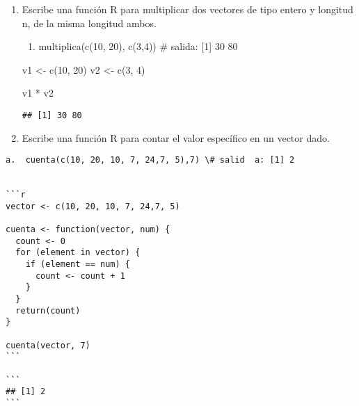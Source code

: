 \documentclass[
]{article}
\newenvironment{Shaded}{\begin{snugshade}}{\end{snugshade}}
\newcommand{\DecValTok}[1]{\textcolor[rgb]{0.00,0.00,0.81}{#1}}
\newcommand{\FunctionTok}[1]{\textcolor[rgb]{0.00,0.00,0.00}{#1}}
\newcommand{\NormalTok}[1]{#1}
\newcommand{\OtherTok}[1]{\textcolor[rgb]{0.56,0.35,0.01}{#1}}
\newcommand{\SpecialCharTok}[1]{\textcolor[rgb]{0.00,0.00,0.00}{#1}}
\providecommand{\tightlist}{%
  \setlength{\itemsep}{0pt}\setlength{\parskip}{0pt}}
\begin{document}
\begin{enumerate}
\def\labelenumi{\arabic{enumi}.}
\setcounter{enumi}{6}
\item
  Escribe una función R para multiplicar dos vectores de tipo entero y
  longitud n, de la misma longitud ambos.

  \begin{enumerate}
  \def\labelenumii{\alph{enumii}.}
  \tightlist
  \item
    multiplica(c(10, 20), c(3,4)) \# salida: {[}1{]} 30 80
  \end{enumerate}

\begin{Shaded}
\begin{Highlighting}[]
\NormalTok{v1 }\OtherTok{\textless{}{-}} \FunctionTok{c}\NormalTok{(}\DecValTok{10}\NormalTok{, }\DecValTok{20}\NormalTok{)}
\NormalTok{v2 }\OtherTok{\textless{}{-}} \FunctionTok{c}\NormalTok{(}\DecValTok{3}\NormalTok{, }\DecValTok{4}\NormalTok{)}

\NormalTok{v1 }\SpecialCharTok{*}\NormalTok{ v2}
\end{Highlighting}
\end{Shaded}

\begin{verbatim}
## [1] 30 80
\end{verbatim}
\item
  Escribe una función R para contar el valor específico en un vector
  dado.
\end{enumerate}

\begin{verbatim}
a.  cuenta(c(10, 20, 10, 7, 24,7, 5),7) \# salid  a: [1] 2


```r
vector <- c(10, 20, 10, 7, 24,7, 5)

cuenta <- function(vector, num) {
  count <- 0
  for (element in vector) {
    if (element == num) {
      count <- count + 1
    }
  }
  return(count)
}

cuenta(vector, 7)
```

```
## [1] 2
```
\end{verbatim}
\end{document}
